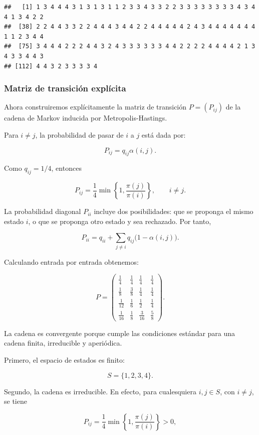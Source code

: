 \documentclass[
]{article}
\begin{document}
\begin{verbatim}
##   [1] 1 3 4 4 4 3 1 3 1 3 1 1 2 3 3 4 3 3 2 2 3 3 3 3 3 3 3 3 4 3 4 4 1 3 4 2 2
##  [38] 2 2 4 4 3 3 2 2 4 4 4 3 4 4 2 2 4 4 4 4 4 2 4 3 4 4 4 4 4 4 4 1 1 2 3 4 4
##  [75] 3 4 4 4 2 2 2 4 4 3 2 4 3 3 3 3 3 3 4 4 2 2 2 2 4 4 4 4 2 1 3 4 3 3 4 4 3
## [112] 4 4 3 2 3 3 3 3 4
\end{verbatim}

\subsubsection{Matriz de transición
explícita}\label{matriz-de-transiciuxf3n-expluxedcita}

Ahora construiremos explícitamente la matriz de transición
\(P=(P_{ij})\) de la cadena de Markov inducida por Metropolis-Hastings.

Para \(i\neq j\), la probabilidad de pasar de \(i\) a \(j\) está dada
por:

\[
P_{ij}=q_{ij}\alpha(i,j).
\]

Como \(q_{ij}=1/4\), entonces

\[
P_{ij}=\frac{1}{4}\min\left\{1,\frac{\pi(j)}{\pi(i)}\right\}, \qquad i\neq j.
\]

La probabilidad diagonal \(P_{ii}\) incluye dos posibilidades: que se
proponga el mismo estado \(i\), o que se proponga otro estado y sea
rechazado. Por tanto,

\[
P_{ii}=q_{ii}+\sum_{j\neq i}q_{ij}\bigl(1-\alpha(i,j)\bigr).
\]

Calculando entrada por entrada obtenemos:

\[
P=
\begin{pmatrix}
\frac14 & \frac14 & \frac14 & \frac14\\[3pt]
\frac18 & \frac38 & \frac14 & \frac14\\[3pt]
\frac1{12} & \frac16 & \frac12 & \frac14\\[3pt]
\frac1{16} & \frac18 & \frac3{16} & \frac58
\end{pmatrix}.
\]

La cadena es convergente porque cumple las condiciones estándar para una
cadena finita, irreducible y aperiódica.

Primero, el espacio de estados es finito:

\[
S=\{1,2,3,4\}.
\]

Segundo, la cadena es irreducible. En efecto, para cualesquiera
\(i,j\in S\), con \(i\neq j\), se tiene

\[
P_{ij}=\frac{1}{4}\min\left\{1,\frac{\pi(j)}{\pi(i)}\right\}>0,
\]
\end{document}
